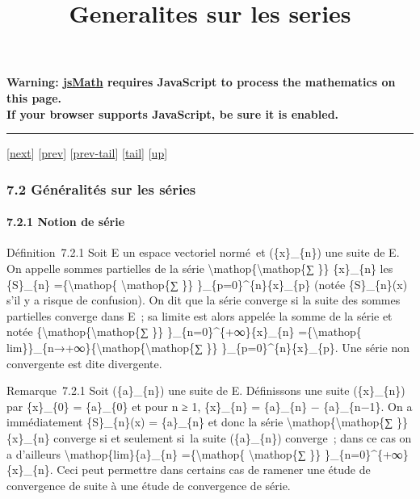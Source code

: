 \documentclass[]{article}
\title{Generalites sur les series}
\author{}
\date{}
\begin{document}
\maketitle

\textbf{Warning: \href{http://www.math.union.edu/locate/jsMath}{jsMath}
requires JavaScript to process the mathematics on this page.\\ If your
browser supports JavaScript, be sure it is enabled.}

\begin{center}\rule{3in}{0.4pt}\end{center}

{[}\href{coursse37.html}{next}{]} {[}\href{coursse35.html}{prev}{]}
{[}\href{coursse35.html\#tailcoursse35.html}{prev-tail}{]}
{[}\hyperref[tailcoursse36.html]{tail}{]}
{[}\href{coursch8.html\#coursse36.html}{up}{]}

\subsubsection{7.2 Généralités sur les séries}

\paragraph{7.2.1 Notion de série}

Définition~7.2.1 Soit E un espace vectoriel normé~et (\{x\}\_\{n\}) une
suite de E. On appelle sommes partielles de la série
\textbackslash{}mathop\{\textbackslash{}mathop\{∑ \}\} \{x\}\_\{n\} les
\{S\}\_\{n\} =\{\textbackslash{}mathop\{ \textbackslash{}mathop\{∑ \}\}
\}\_\{p=0\}\^{}\{n\}\{x\}\_\{p\} (notée \{S\}\_\{n\}(x) s'il y a risque
de confusion). On dit que la série converge si la suite des sommes
partielles converge dans E~; sa limite est alors appelée la somme de la
série et notée \{\textbackslash{}mathop\{\textbackslash{}mathop\{∑ \}\}
\}\_\{n=0\}\^{}\{+∞\}\{x\}\_\{n\} =\{\textbackslash{}mathop\{
lim\}\}\_\{n→+∞\}\{\textbackslash{}mathop\{\textbackslash{}mathop\{∑
\}\} \}\_\{p=0\}\^{}\{n\}\{x\}\_\{p\}. Une série non convergente est
dite divergente.

Remarque~7.2.1 Soit (\{a\}\_\{n\}) une suite de E. Définissons une suite
(\{x\}\_\{n\}) par \{x\}\_\{0\} = \{a\}\_\{0\} et pour n ≥ 1,
\{x\}\_\{n\} = \{a\}\_\{n\} − \{a\}\_\{n−1\}. On a immédiatement
\{S\}\_\{n\}(x) = \{a\}\_\{n\} et donc la série
\textbackslash{}mathop\{\textbackslash{}mathop\{∑ \}\} \{x\}\_\{n\}
converge si et seulement si~la suite (\{a\}\_\{n\}) converge~; dans ce
cas on a d'ailleurs \textbackslash{}mathop\{lim\}\{a\}\_\{n\}
=\{\textbackslash{}mathop\{ \textbackslash{}mathop\{∑ \}\}
\}\_\{n=0\}\^{}\{+∞\}\{x\}\_\{n\}. Ceci peut permettre dans certains cas
de ramener une étude de convergence de suite à une étude de convergence
de série.
\end{document}
